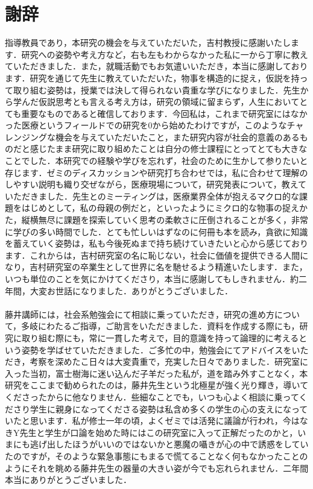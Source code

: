 \chapter{謝辞}

指導教員であり，本研究の機会を与えていただいた，吉村教授に感謝いたします．研究への姿勢や考え方など，右も左もわからなかった私に一から丁寧に教えていただきました．また，就職活動でもお気遣いいただき，本当に感謝しております．研究を通じて先生に教えていただいた，物事を構造的に捉え，仮説を持って取り組む姿勢は，授業では決して得られない貴重な学びになりました．先生から学んだ仮説思考とも言える考え方は，研究の領域に留まらず，人生においてとても重要なものであると確信しております．今回私は，これまで研究室にはなかった医療というフィールドでの研究を0から始めたわけですが，このようなチャレンジングな機会を与えていただいたこと，また研究内容が社会的意義のあるものだと感じたまま研究に取り組めたことは自分の修士課程にとってとても大きなことでした．本研究での経験や学びを忘れず，社会のために生かして参りたいと存じます．ゼミのディスカッションや研究打ち合わせでは，私に合わせて理解のしやすい説明も織り交ぜながら，医療現場について，研究発表について，教えていただきました．先生とのミーティングは，医療業界全体が抱えるマクロ的な課題をはじめとして，私の母親の例だと，といったようにミクロ的な物事の捉えかた，縦横無尽に課題を探索していく思考の柔軟さに圧倒されることが多く，非常に学びの多い時間でした．とても忙しいはずなのに何冊も本を読み，貪欲に知識を蓄えていく姿勢は，私も今後死ぬまで持ち続けていきたいと心から感じております．これからは，吉村研究室の名に恥じない，社会に価値を提供できる人間になり，吉村研究室の卒業生として世界に名を馳せるよう精進いたします．また，いつも単位のことを気にかけてくださり，本当に感謝してもしきれません．約二年間，大変お世話になりました．ありがとうございました．\\
\\
\quad 藤井講師には，社会系勉強会にて相談に乗っていただき，研究の進め方について，多岐にわたるご指導，ご助言をいただきました．資料を作成する際にも，研究に取り組む際にも，常に一貫した考えで，目的意識を持って論理的に考えるという姿勢を学ばせていただきました．ご多忙の中，勉強会にてアドバイスをいただき，考察を深めたこ日々は大変貴重で，充実した日々でありました．研究室に入った当初，富士樹海に迷い込んだ子羊だった私が，道を踏み外すことなく，本研究をここまで勧められたのは，藤井先生という北極星が強く光り輝き，導いてくださったからに他なりません．些細なことでも，いつも心よく相談に乗ってくださり学生に親身になってくださる姿勢は私含め多くの学生の心の支えになっていたと思います．私が修士一年の頃，よくゼミでは活発に議論が行われ，今はなきY先生と学生が口論を始めた時にはこの研究室に入って正解だったのかと，いまにも逃げ出したほうがいいのではないかと悪魔の囁きが心の中で誘惑をしていたのですが，そのような緊急事態にもまるで慌てることなく何もなかったことのようにそれを眺める藤井先生の器量の大きい姿が今でも忘れられません．二年間本当にありがとうございました．\\
